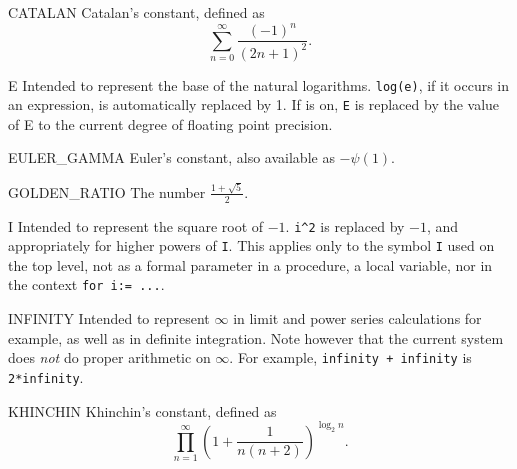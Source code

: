 \begin{list}{}{\renewcommand{\makelabel}[1]{\texttt{#1}\hspace{\fill}}%
               \setlength{\labelsep}{1em}%
               }

\item[CATALAN] Catalan's constant, defined as
  \begin{displaymath}
    \sum_{n=0}^{\infty} \frac{(-1)^{n}}{(2n+1)^{2}} .
  \end{displaymath}

\item[E] Intended to represent the base of
the natural logarithms.  \texttt{log(e)}, if it occurs in an expression, is
automatically replaced by 1.  If  is
on, \texttt{E} is replaced by the value of E to the current degree of
floating point precision.

\item[EULER\_GAMMA] Euler's constant, also available as $-\psi(1)$.

\item[GOLDEN\_RATIO] The number $\frac{1+\sqrt{5}}{2}$.

\item[I] Intended to represent the square
root of $-1$. \texttt{i\textasciicircum2} is replaced by $-1$, and
appropriately for higher powers of \texttt{I}.  This applies only to the
symbol \texttt{I} used on the top
level, not as a formal parameter in a procedure, a local variable, nor in
the context \texttt{for i:= ...}.

\item[INFINITY] Intended to represent $\infty$
in limit and power series calculations for example, as well as in definite integration.
Note however that the
current system does \emph{not} do proper arithmetic on $\infty$.  For example,
\texttt{infinity + infinity} is \texttt{2*infinity}.

\item[KHINCHIN] Khinchin's constant, defined as
  \begin{displaymath}
    \prod_{n=1}^{\infty}\left(1+\frac{1}{n(n+2)}\right)^{\log_{2} n} .
  \end{displaymath}


\end{list}
